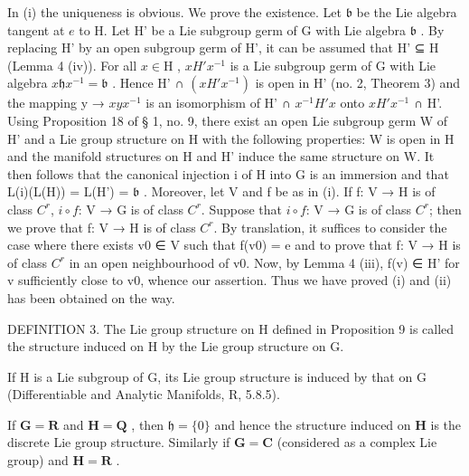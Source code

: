 In (i) the uniqueness is obvious. We prove the existence. Let \(\mathfrak{b}\) be the Lie algebra tangent at \(e\) to H. Let H' be a Lie subgroup germ of G with Lie algebra \(\mathfrak{b}\) . By replacing H' by an open subgroup germ of H', it can be assumed that H' ⊆ H (Lemma 4 (iv)). For all \(x \in \mathrm{H}\) , \(xH'x^{-1}\) is a Lie subgroup germ of G with Lie algebra \(x \mathfrak{h}x^{-1} = \mathfrak{b}\) . Hence H' ∩ \((xH'x^{-1})\) is open in H' (no. 2, Theorem 3) and the mapping y → \(xyx^{-1}\) is an isomorphism of H' ∩ \(x^{-1}H'x\) onto \(xH'x^{-1}\) ∩ H'. Using Proposition 18 of § 1, no. 9, there exist an open Lie subgroup germ W of H' and a Lie group structure on H with the following properties: W is open in H and the manifold structures on H and H' induce the same structure on W. It then follows that the canonical injection i of H into G is an immersion and that L(i)(L(H)) = L(H') = \(\mathfrak{b}\) . Moreover, let V and f be as in (i). If f: V → H is of class \(C^r\), \(i \circ f\): V → G is of class \(C^r\). Suppose that \(i \circ f\): V → G is of class \(C^r\); then we prove that f: V → H is of class \(C^r\). By translation, it suffices to consider the case where there exists v0 ∈ V such that f(v0) = e and to prove that f: V → H is of class \(C^r\) in an open neighbourhood of v0. Now, by Lemma 4 (iii), f(v) ∈ H' for v sufficiently close to v0, whence our assertion. Thus we have proved (i) and (ii) has been obtained on the way.

DEFINITION 3. The Lie group structure on H defined in Proposition 9 is called the structure induced on H by the Lie group structure on G.

If H is a Lie subgroup of G, its Lie group structure is induced by that on G (Differentiable and Analytic Manifolds, R, 5.8.5).

If \(\mathbf{G} = \mathbf{R}\) and \(\mathbf{H} = \mathbf{Q}\) , then \(\mathfrak{h} = \{0\}\) and hence the structure induced on \(\mathbf{H}\) is the discrete Lie group structure. Similarly if \(\mathbf{G} = \mathbf{C}\) (considered as a complex Lie group) and \(\mathbf{H} = \mathbf{R}\) .

